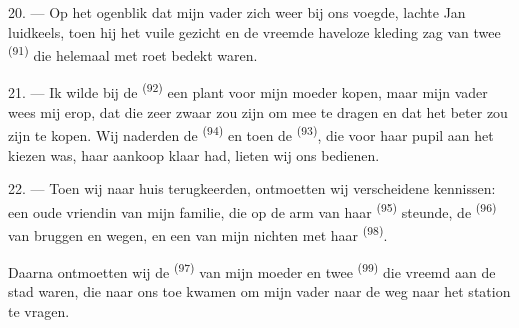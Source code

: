 \VUsaut{3.0mm}

20. --- Op het ogenblik dat mijn vader zich weer bij ons voegde, lachte Jan luidkeels, toen
hij het vuile gezicht en de vreemde haveloze kleding zag van twee
 \textsuperscript{(91)} die helemaal met roet bedekt
waren.

21. --- Ik wilde bij de  \textsuperscript{(92)} een plant voor mijn
moeder kopen, maar mijn vader wees mij erop, dat die zeer zwaar zou zijn om mee te dragen en
dat het beter zou zijn  te kopen. Wij naderden de 
\textsuperscript{(94)} en toen de
 \textsuperscript{(93)}, die voor haar pupil aan het kiezen
was, haar aankoop klaar had, lieten wij ons bedienen.

22. --- Toen wij naar huis terugkeerden, ontmoetten wij verscheidene kennissen: een oude
vriendin van mijn familie, die op de arm van haar 
\textsuperscript{(95)} steunde, de  \textsuperscript{(96)} van bruggen en
wegen, en een van mijn nichten met haar  \textsuperscript{(98)}.

Daarna ontmoetten wij de  \textsuperscript{(97)} van mijn moeder en twee
 \textsuperscript{(99)} die vreemd aan de stad waren, die naar ons toe kwamen
om mijn vader naar de weg naar het station te vragen.
\VUsaut{6.0mm}
\VUfilet{22mm}

